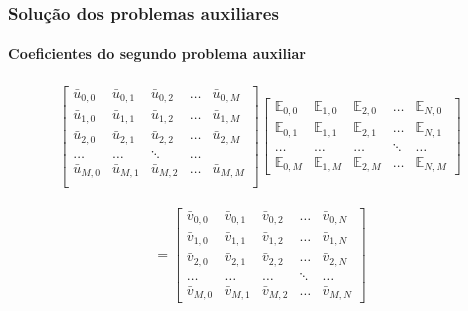 \documentclass{beamer}
\begin{document}
\begin{frame}
	\frametitle{Solução dos problemas auxiliares}
	\framesubtitle{Coeficientes do segundo problema auxiliar}
	
	\begin{align*}
	\begin{bmatrix}
	\bar{u}_{0,0} & \bar{u}_{0,1} & \bar{u}_{0,2} & \ldots & \bar{u}_{0,M} \\
	\bar{u}_{1,0} & \bar{u}_{1,1} & \bar{u}_{1,2} & \ldots & \bar{u}_{1,M} \\
	\bar{u}_{2,0} & \bar{u}_{2,1} & \bar{u}_{2,2} & \ldots & \bar{u}_{2,M} \\
	\ldots & \ldots & \ddots & \ldots\\
	\bar{u}_{M,0} & \bar{u}_{M,1} & \bar{u}_{M,2} & \ldots & \bar{u}_{M,M} \\
	\end{bmatrix}
	\begin{bmatrix}
	\mathbb{E}_{0,0} & \mathbb{E}_{1,0} & \mathbb{E}_{2,0} & \ldots & \mathbb{E}_{N,0} \\
	\mathbb{E}_{0,1} & \mathbb{E}_{1,1} & \mathbb{E}_{2,1} & \ldots & \mathbb{E}_{N,1} \\
	\ldots & \ldots & \ldots & \ddots & \ldots \\
	\mathbb{E}_{0,M} & \mathbb{E}_{1,M} & \mathbb{E}_{2,M} & \ldots & \mathbb{E}_{N,M}
	\end{bmatrix}
	\end{align*}
	
	\begin{align*}	
	=
	\begin{bmatrix}
	\bar{v}_{0, 0} & \bar{v}_{0, 1} &\bar{v}_{0, 2} & \ldots & \bar{v}_{0, N} \\
	\bar{v}_{1, 0} & \bar{v}_{1, 1} &\bar{v}_{1, 2} & \ldots & \bar{v}_{1, N} \\
	\bar{v}_{2, 0} & \bar{v}_{2, 1} &\bar{v}_{2, 2} & \ldots & \bar{v}_{2, N} \\
	\ldots & \ldots & \ldots & \ddots & \ldots \\
	\bar{v}_{M, 0} & \bar{v}_{M, 1} &\bar{v}_{M, 2} & \ldots & \bar{v}_{M, N}
	\end{bmatrix}
	\end{align*}
\end{frame}
\end{document}
